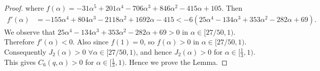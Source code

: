 \documentclass[10pt,a4paper]{amsart}
\begin{document}
\begin{proof}
where $f(\alpha)=-31\alpha^{5}+201\alpha^{4}-706\alpha^{3}+846\alpha^{2}-415\alpha+105$. Then
\begin{align*}
 f'(\alpha)&=-155\alpha^{4}+804\alpha^{3}-2118\alpha^{2}+1692\alpha-415<-6(25\alpha^{4}-134\alpha^{3}+353\alpha^{2}-282\alpha+69).
 \end{align*}We observe that $25\alpha^{4}-134\alpha^{3}+353\alpha^{2}-282\alpha+69>0$ in $\alpha\in[27/50, 1)$. Therefore $f'(\alpha)<0$. Also since $f(1)=0$, so
 $f(\alpha)>0$ in $\alpha\in[27/50, 1)$. Consequently $J_{2}(\alpha)>0$ $\forall\alpha\in[27/50,1)$, and hence $J_{2}(\alpha)>0$ for $\alpha\in[\frac{1}{3}, 1)$. This gives $C_{6}(q,\alpha)>0$ for $\alpha\in[\frac{1}{3}, 1)$. Hence we prove the Lemma.
\end{proof}
\end{document}
